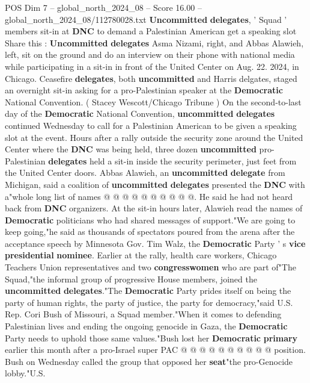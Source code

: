 \begin{textsample}{POS Dim 7 – global\_north\_2024\_08 – Score 16.00 – global\_north\_2024\_08/112780028.txt}  \label{ex:f7_pos_003}
\textbf{Uncommitted} \textbf{delegates}, ' Squad ' members sit-in at \textbf{DNC} to demand a Palestinian American get a speaking slot Share this : \textbf{Uncommitted} \textbf{delegates} Asma Nizami, right, and Abbas Alawieh, left, sit on the ground and do an interview on their phone with national media while participating in a sit-in in front of the United Center on Aug. 22. 2024, in Chicago.
Ceasefire \textbf{delegates}, both \textbf{uncommitted} and Harris delgates, staged an overnight sit-in asking for a pro-Palestinian speaker at the \textbf{Democratic} National Convention. ( Stacey Wescott/Chicago Tribune ) On the second-to-last day of the \textbf{Democratic} National Convention, \textbf{uncommitted} \textbf{delegates} continued Wednesday to call for a Palestinian American to be given a speaking slot at the event.
Hours after a rally outside the security zone around the United Center where the \textbf{DNC} was being held, three dozen \textbf{uncommitted} pro-Palestinian \textbf{delegates} held a sit-in inside the security perimeter, just feet from the United Center doors.
Abbas Alawieh, an \textbf{uncommitted} \textbf{delegate} from Michigan, said a coalition of \textbf{uncommitted} \textbf{delegates} presented the \textbf{DNC} with a"whole long list of names @ @ @ @ @ @ @ @ @ @.
He said he had not heard back from \textbf{DNC} organizers.
At the sit-in hours later, Alawieh read the names of \textbf{Democratic} politicians who had shared messages of support."We are going to keep going,"he said as thousands of spectators poured from the arena after the acceptance speech by Minnesota Gov.
Tim Walz, the \textbf{Democratic} Party ' s \textbf{vice} \textbf{presidential} \textbf{nominee}.
Earlier at the rally, health care workers, Chicago Teachers Union representatives and two \textbf{congresswomen} who are part of"The Squad,"the informal group of progressive House members, joined the \textbf{uncommitted} \textbf{delegates}."The \textbf{Democratic} Party prides itself on being the party of human rights, the party of justice, the party for democracy,"said U.S.
Rep.
Cori Bush of Missouri, a Squad member."When it comes to defending Palestinian lives and ending the ongoing genocide in Gaza, the \textbf{Democratic} Party needs to uphold those same values."Bush lost her \textbf{Democratic} \textbf{primary} earlier this month after a pro-Israel super PAC @ @ @ @ @ @ @ @ @ @ position.
Bush on Wednesday called the group that opposed her \textbf{seat}"the pro-Genocide lobby."U.S.

\end{textsample}
